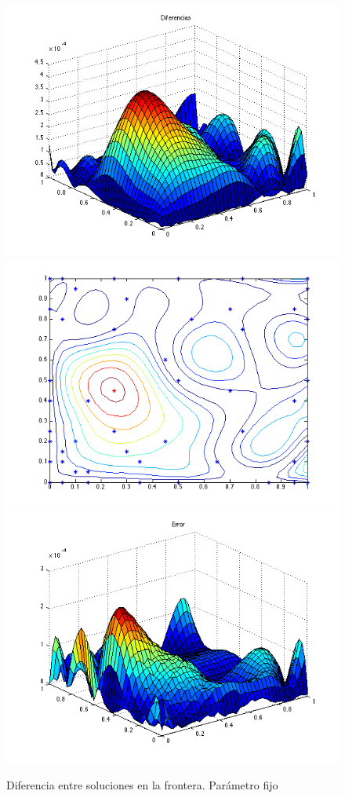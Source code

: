 \documentclass[11pt,a4paper]{article}
\begin{document}
 \begin{figure}

\includegraphics[scale=.27]{diferencias1_3.png}
\includegraphics[scale=.27]{centros1_3.png}
\includegraphics[scale=.27]{error1_3.png}
\caption{Diferencia entre soluciones en la frontera. Parámetro fijo}
\end{figure}
\end{document}
